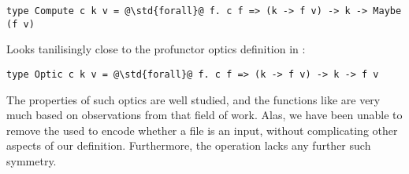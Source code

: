 \begin{verbatim}
type Compute c k v = @\std{forall}@ f. c f => (k -> f v) -> k -> Maybe (f v)
\end{verbatim}

Looks tanilisingly close to the profunctor optics definition in \cite{gibbons-profunctor-optics}:

\begin{verbatim}
type Optic c k v = @\std{forall}@ f. c f => (k -> f v) -> k -> f v
\end{verbatim}

The properties of such optics are well studied, and the functions like  are very much based on observations from that field of work. Alas, we have been unable to remove the  used to encode whether a file is an input, without complicating other aspects of our definition. Furthermore, the  operation lacks any further such symmetry.
